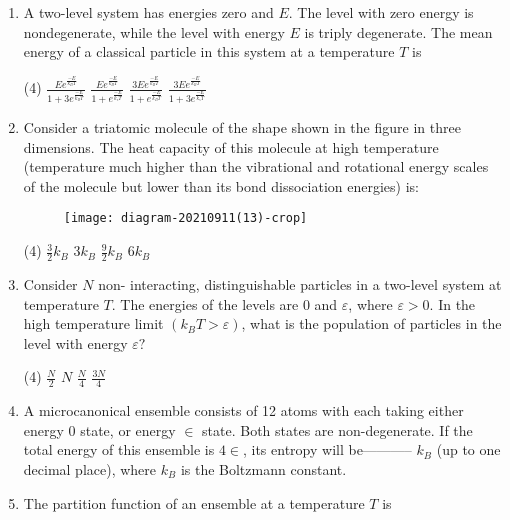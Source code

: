 \begin{enumerate}
	{}
	\item A two-level system has energies zero and $E$. The level with zero energy is nondegenerate, while the level with energy $E$ is triply degenerate. The mean energy of a classical particle in this system at a temperature $T$ is
	{}
	\begin{tasks}(4)
		\task[\textbf{A.}]  $\frac{E e^{\frac{-E}{k_{B} T}}}{1+3 e^{\frac{-E}{k_{B} T}}}$
		\task[\textbf{B.}] $\frac{E e^{\frac{-E}{k_{B} T}}}{1+e^{\frac{-E}{k_{s} T}}}$
		\task[\textbf{C.}] $\frac{3 E e^{\frac{-E}{k_{B} T}}}{1+e^{\frac{-E}{k_{B} T}}}$
		\task[\textbf{D.}] $\frac{3 E e^{\frac{-E}{k_{B} T}}}{1+3 e^{\frac{-E}{k_{s} T}}}$
	\end{tasks}	
	\item Consider a triatomic molecule of the shape shown in the figure in three dimensions. The heat capacity of this molecule at high temperature (temperature much higher than the vibrational and rotational energy scales of the molecule but lower than its bond dissociation energies) is:
	{}
	\begin{figure}[H]
		\centering
		\texttt{[image: diagram-20210911(13)-crop]}
	\end{figure}
	\begin{tasks}(4)
		\task[\textbf{A.}] $\frac{3}{2} k_{B}$
		\task[\textbf{B.}] $3 k_{B}$
		\task[\textbf{C.}] $\frac{9}{2} k_{B}$
		\task[\textbf{D.}] $6 k_{B}$
	\end{tasks}
	\item Consider $N$ non- interacting, distinguishable particles in a two-level system at temperature $T$. The energies of the levels are 0 and $\varepsilon$, where $\varepsilon>0$. In the high temperature limit $\left(k_{B} T>\varepsilon\right)$, what is the population of particles in the level with energy $\varepsilon ?$
	{}
	\begin{tasks}(4)
		\task[\textbf{A.}] $\frac{N}{2}$
		\task[\textbf{B.}] $N$
		\task[\textbf{C.}] $\frac{N}{4}$
		\task[\textbf{D.}] $\frac{3 N}{4}$
	\end{tasks}
	\item  A microcanonical ensemble consists of 12 atoms with each taking either energy 0 state, or energy $\in$ state. Both states are non-degenerate. If the total energy of this ensemble is $4 \in$, its entropy will be----------- $k_{B}$ (up to one decimal place), where $k_{B}$ is the Boltzmann constant.
	{}
	\item  The partition function of an ensemble at a temperature $T$ is

\end{enumerate}

